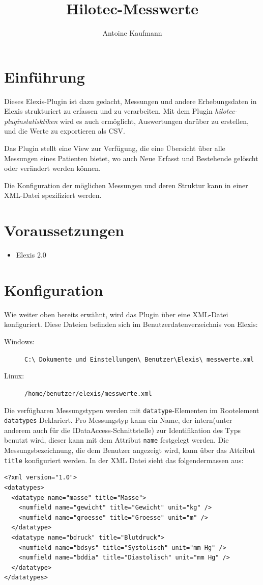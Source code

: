 \documentclass[a4paper]{scrartcl}
\title{Hilotec-Messwerte}
\author{Antoine Kaufmann}
\begin{document}
\maketitle
\section{Einführung}
Dieses Elexis-Plugin ist dazu gedacht, Messungen und andere Erhebungsdaten in
Elexis strukturiert zu erfassen und zu verarbeiten. Mit dem Plugin
\textit{hilotec-pluginstatisktiken} wird es auch ermöglicht, Auswertungen
darüber zu erstellen, und die Werte zu exportieren als CSV.

Das Plugin stellt eine View zur Verfügung, die eine Übersicht über alle
Messungen eines Patienten bietet, wo auch Neue Erfasst und Bestehende gelöscht
oder verändert werden können.

Die Konfiguration der möglichen Messungen und deren Struktur kann in einer
XML-Datei spezifiziert werden. 


\section{Voraussetzungen}
\begin{itemize}
    \item Elexis 2.0
\end{itemize}

\section{Konfiguration}
Wie weiter oben bereits erwähnt, wird das Plugin über eine XML-Datei
konfiguriert. Diese Dateien befinden sich im Benutzerdatenverzeichnis von
Elexis:
\begin{description}
    \item[Windows:] \texttt{C:\textbackslash
                                Dokumente und Einstellungen\textbackslash
                                Benutzer\textbackslash Elexis\textbackslash
                                messwerte.xml}
    \item[Linux:] \texttt{/home/benutzer/elexis/messwerte.xml}
\end{description}

Die verfügbaren Messungstypen werden mit \texttt{datatype}-Elementen im
Rootelement \texttt{datatypes} Deklariert. Pro Messungstyp kann ein Name, der
intern(unter anderem auch für die IDataAccess-Schnittstelle) zur Identifikation
des Typs benutzt wird, dieser kann mit dem Attribut \texttt{name} festgelegt
werden. Die Messungsbezeichnung, die dem Benutzer angezeigt wird, kann über das
Attribut \texttt{title} konfiguriert werden. In der XML Datei sieht das
folgendermassen aus:
\begin{lstlisting}
<?xml version="1.0">
<datatypes>
  <datatype name="masse" title="Masse">
    <numfield name="gewicht" title="Gewicht" unit="kg" />
    <numfield name="groesse" title="Groesse" unit="m" />
  </datatype>
  <datatype name="bdruck" title="Blutdruck">
    <numfield name="bdsys" title="Systolisch" unit="mm Hg" />
    <numfield name="bddia" title="Diastolisch" unit="mm Hg" />
  </datatype>
</datatypes>
\end{lstlisting}
\end{document}
